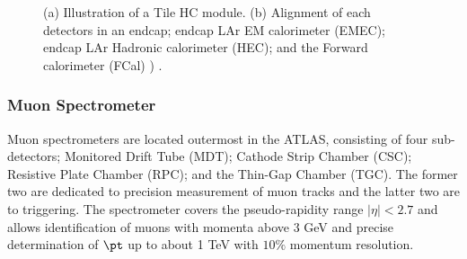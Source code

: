 \begin{figure}[h]
  \centering
    \caption{ (a) Illustration of a Tile HC module. (b)  Alignment of each detectors in an endcap; endcap LAr EM calorimeter (EMEC); endcap LAr Hadronic calorimeter (HEC); and the Forward calorimeter (FCal)   ) \cite{ATLAS_exp}.
      \label{fig::Detector::caloCell} }
\end{figure}




\subsubsection{Muon Spectrometer}
Muon spectrometers are located outermost in the ATLAS, consisting of four sub-detectors; Monitored Drift Tube (MDT); Cathode Strip Chamber (CSC); Resistive Plate Chamber (RPC); and the Thin-Gap Chamber (TGC). 
The former two are dedicated to precision measurement of muon tracks and the latter two are to triggering. 
The spectrometer covers the pseudo-rapidity range $ |\eta|< 2.7$ and allows identification of muons with momenta above 3 GeV and precise determination of $\pt$ up to about 1 TeV with $10\%$ momentum resolution. \\

